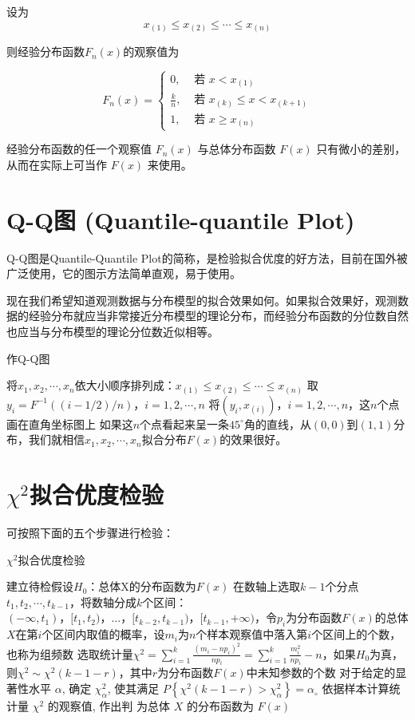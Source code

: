 设为
$$
x_{(1)} \leq x_{(2)} \leq \cdots \leq x_{(n)}
$$

则经验分布函数$F_{n}(x)$的观察值为

$$
F_{n}(x)=\left\{\begin{array}{ll}
0, & \text { 若 } x<x_{(1)} \\
\frac{k}{n}, & \text { 若 } x_{(k)} \leq x<x_{(k+1)} \\
1, & \text { 若 } x \geq x_{(n)}
\end{array}\right.
$$

经验分布函数的任一个观察值 $F_n(x)$ 与总体分布函数 $F(x)$ 只有微小的差别，从而在实际上可当作 $F(x)$ 来使用。

\section{Q-Q图 (Quantile-quantile Plot)}

Q-Q图是Quantile-Quantile Plot的简称，是检验拟合优度的好方法，目前在国外被广泛使用，它的图示方法简单直观，易于使用。

现在我们希望知道观测数据与分布模型的拟合效果如何。如果拟合效果好，观测数据的经验分布就应当非常接近分布模型的理论分布，而经验分布函数的分位数自然也应当与分布模型的理论分位数近似相等。

\begin{algorithm}
    \caption{作Q-Q图}
    
将$x_1,x_2,\cdots,x_n$依大小顺序排列成：$x_{(1)}\le x_{(2)}\le\cdots\le x_{(n)}$\;
取$y_i=F^{-1}((i-1/2)/n)，i=1,2,\cdots,n$\;
将$(y_i,x_{(i)})，i=1,2,\cdots,n$，这$n$个点画在直角坐标图上\;
如果这$n$个点看起来呈一条$45^\circ$角的直线，从$(0,0)$到$(1,1)$分布，我们就相信$x_1,x_2,\cdots,x_n$拟合分布$F(x)$的效果很好。
\end{algorithm}

\section{$\chi^2$拟合优度检验}

可按照下面的五个步骤进行检验：

\begin{algorithm}
\caption{$\chi^2$拟合优度检验}
建立待检假设$H_0$：总体X的分布函数为$F(x)$\;
在数轴上选取$k-1$个分点$t_1,t_2,\cdots,t_{k-1}$，将数轴分成$k$个区间：$(-\infty,t_1)，[t_1,t_2)，…，[t_{k-2},t_{k-1})，[t_{k-1},+\infty)$，令$p_i$为分布函数$F(x)$的总体$X$在第$i$个区间内取值的概率，设$m_i$为$n$个样本观察值中落入第$i$个区间上的个数，也称为组频数\;
选取统计量$\chi^2=\sum_{i=1}^{k}\frac{(m_i-np_i)^2}{np_i}=\sum_{i=1}^{k}{\frac{m_i^2}{np_i}-n}$，如果$H_0$为真，则$\chi^2 \sim \chi^2(k-1-r)$，其中$r$为分布函数$F(x)$中未知参数的个数\;
对于给定的显著性水平 \( \alpha \), 确定 \( \chi_{\alpha}^{2} \), 使其满足 \( P\left\{\chi^{2}(k-1-r)>\chi_{\alpha}^{2}\right\}=\alpha_{\circ} \) \;
依据样本计算统计量 \( \chi^{2} \) 的观察值, 作出判
为总体 \( X \) 的分布函数为 \( F(x) \) \;
\end{algorithm}

